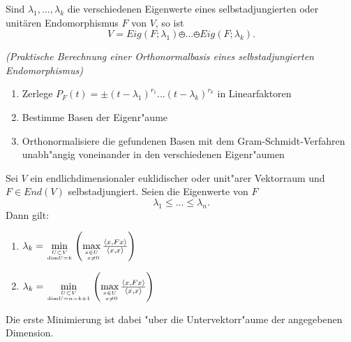 \documentclass[8pt, a4paper, twocolumn, landscape]{article}
\newcommand{\comment}[1]{}
\begin{document}
\comment{
\begin{theorem}
Ist \(F\) ein selbstadjungierter Endomorphismus eines euklidischen bzw. unitären endlichdimensionalen Vektorraumes, so gibt es eine Orthonormalbasis von \(V\), die aus Eigenvektoren von \(F\) besteht. Insbesondere ist $F$ also diagonalisierbar.
\end{theorem}


\begin{theorem}
Ist \(A \in \mathbb{M}(n \times n ; K)\) eine symmetrische bzw. hermitesche Matrix, so
gibt es eine orthogonale bzw. unitäre Matrix $S$, so dass
$$
S^\dagger A S = 
\left(\begin{array}{ccc}\lambda_{1} & & 0 
\\ & \ddots & 
\\ 0 & & \lambda_{n}\end{array}\right)
$$
mit $\lambda_1, ..., \lambda_n \in \mathbb{R}$.
\end{theorem}
}

\begin{corollary}
Sind \(\lambda_{1}, ..., \lambda_{k}\) die verschiedenen Eigenwerte eines selbstadjungierten oder unitären Endomorphismus \(F\) von \(V\), so ist
$$
V= Eig (F ; \lambda_{1}) \obot ... \obot Eig(F ; \lambda_{k}).
$$
\end{corollary}

\begin{remark} \textit{(Praktische Berechnung einer Orthonormalbasis eines selbstadjungierten Endomorphismus)}
\begin{enumerate}
\item Zerlege $P_F(t) = \pm (t- \lambda_1)^{r_1} ... (t- \lambda_k)^{r_k} $ in Linearfaktoren
\item Bestimme Basen der Eigenr"aume
\item Orthonormalisiere die gefundenen Basen mit dem Gram-Schmidt-Verfahren unabh"angig voneinander in den verschiedenen Eigenr"aumen
\end{enumerate}

\end{remark}

\begin{theorem} Sei $V$ ein endlichdimensionaler euklidischer oder unit"arer Vektorraum und $F \in End(V)$ selbstadjungiert. Seien die Eigenwerte von $F$ 
$$
\lambda_1 \leq ... \leq \lambda_n.
$$
Dann gilt:
\begin{enumerate}
\item $\lambda_k = \min\limits_{U\subset V \atop \mathrm{dim} U = k} \left(   \max\limits_{x\in U \atop \ x \neq 0} \frac{\left\langle {x} , {Fx} \right\rangle}{\left\langle {x} , {x} \right\rangle}\right)$
\item $\lambda_k = \min\limits_{U\subset V \atop \mathrm{dim} U = n - k + 1} \left(   \max\limits_{x\in U \atop \ x \neq 0} \frac{\left\langle {x} , {Fx} \right\rangle}{\left\langle {x} , {x} \right\rangle}\right)$
\end{enumerate}
Die erste Minimierung ist dabei "uber die Untervektorr"aume der angegebenen Dimension.
\end{theorem}
 
\end{document}

